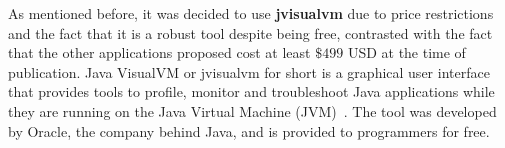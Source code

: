As mentioned before, it was decided to use \textbf{jvisualvm} due to price restrictions and the fact that it is a robust tool despite being free, contrasted with the fact that the other applications proposed cost at least $\$499$ USD at the time of publication.
Java VisualVM or jvisualvm for short is a graphical user interface that provides tools to profile, monitor and troubleshoot Java applications while they are running on the Java Virtual Machine (JVM)~\cite{java2019jvisualvm}.
The tool was developed by Oracle, the company behind Java, and is provided to programmers for free.